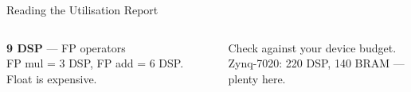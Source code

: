 \documentclass[aspectratio=169,12pt]{beamer}
\begin{document}
\begin{frame}{Reading the Utilisation Report}
\begin{columns}[T,totalwidth=\textwidth]
  \vspace{8pt}
  \colorbox{Teal!10}{\parbox{\dimexpr\linewidth-2\fboxsep\relax}{\vspace{3pt}
    {\color{Teal}\bfseries 9 DSP} — FP operators\\
    {\small FP mul = 3 DSP, FP add = 6 DSP. Float is expensive.}
  \vspace{3pt}}}

  \vspace{8pt}
  {\small\color{Navy}Check against your device budget.\\
  Zynq-7020: 220 DSP, 140 BRAM — plenty here.}

\end{columns}
\end{frame}

\end{document}

